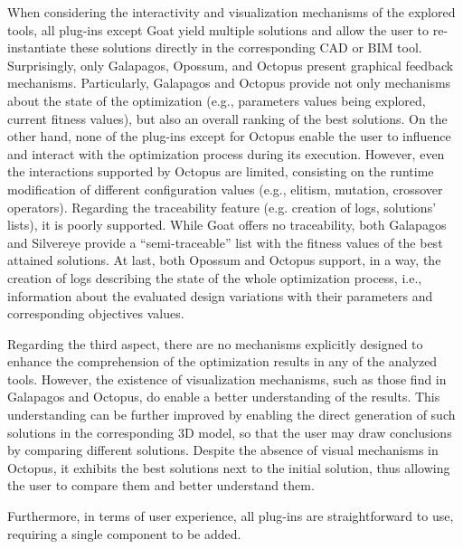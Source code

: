 	When considering the interactivity and visualization mechanisms of the explored tools, all plug-ins except Goat yield multiple solutions and allow the user to re-instantiate these solutions directly in the corresponding \ac{CAD} or \ac{BIM} tool. Surprisingly, only Galapagos, Opossum, and Octopus present graphical feedback mechanisms. Particularly, Galapagos and Octopus provide not only mechanisms about the state of the optimization (e.g., parameters values being explored, current fitness values), but also an overall ranking of the best solutions. On the other hand, none of the plug-ins except for Octopus enable the user to influence and interact with the optimization process during its execution. However, even the interactions supported by Octopus are limited, consisting on the runtime modification of different configuration values (e.g., elitism, mutation, crossover operators). Regarding the traceability feature (e.g. creation of logs, solutions' lists), it is poorly supported. While Goat offers no traceability, both Galapagos and Silvereye provide a ``semi-traceable'' list with the fitness values of the best attained solutions. At last, both Opossum and Octopus support, in a way, the creation of logs describing the state of the whole optimization process, i.e., information about the evaluated design variations with their parameters and corresponding objectives values.
	
	Regarding the third aspect, there are no mechanisms explicitly designed to enhance the comprehension of the optimization results in any of the analyzed tools. However, the existence of visualization mechanisms, such as those find in Galapagos and Octopus, do enable a better understanding of the results. This understanding can be further improved by enabling the direct generation of such solutions in the corresponding 3D model, so that the user may draw conclusions by comparing different solutions. Despite the absence of visual mechanisms in Octopus, it exhibits the best solutions next to the initial solution, thus allowing the user to compare them and better understand them.
	
	Furthermore, in terms of user experience, all plug-ins are straightforward to use, requiring a single component to be added.  
	
	
